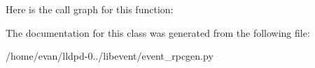 \-Here is the call graph for this function\-:




\-The documentation for this class was generated from the following file\-:\begin{DoxyCompactItemize}
\item 
/home/evan/lldpd-\/0../libevent/event\-\_\-rpcgen.\-py\end{DoxyCompactItemize}
